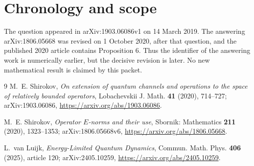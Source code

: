 \documentclass[11pt]{article}
\begin{document}
\section*{Chronology and scope}

The question appeared in arXiv:1903.06086v1 on 14 March 2019.  The answering
arXiv:1806.05668 was revised on 1 October 2020, after that question, and the
published 2020 article contains Proposition 6.  Thus the identifier of the
answering work is numerically earlier, but the decisive revision is later.
No new mathematical result is claimed by this packet.

\begin{thebibliography}{9}
M.~E. Shirokov,
\emph{On extension of quantum channels and operations to the space of
relatively bounded operators},
Lobachevskii J. Math. \textbf{41} (2020), 714--727;
arXiv:1903.06086,
\url{https://arxiv.org/abs/1903.06086}.

M.~E. Shirokov,
\emph{Operator $E$-norms and their use},
Sbornik: Mathematics \textbf{211} (2020), 1323--1353;
arXiv:1806.05668v6,
\url{https://arxiv.org/abs/1806.05668}.

L.~van Luijk,
\emph{Energy-Limited Quantum Dynamics},
Commun. Math. Phys. \textbf{406} (2025), article 120;
arXiv:2405.10259,
\url{https://arxiv.org/abs/2405.10259}.
\end{thebibliography}
\end{document}
